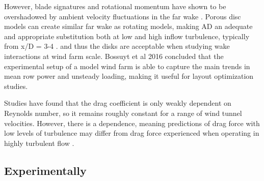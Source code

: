 However, blade signatures and rotational momentum have shown to be overshadowed by ambient velocity fluctuations in the far wake \cite{Aubrun2013}. Porous disc models can create similar far wake as rotating models, making AD an adequate and appropriate substitution both at low and high inflow turbulence, typically from x/D = 3-4 \cite{Neunaber} \cite{Aubrun2019} \cite{Aubrun2013} \cite{Lignarolo2014} \cite{Thenuissen} \cite{CampCal}. and thus the disks are acceptable when studying wake interactions at wind farm scale. Bossuyt et al 2016 concluded that the experimental setup of a model wind farm is able to capture the main trends in mean row power and unsteady loading, making it useful for layout optimization studies. 

Studies have found that the drag coefficient is only weakly dependent on Reynolds number, so it remains roughly constant for a range of wind tunnel velocities. However, there is a dependence, meaning predictions of drag force with low levels of turbulence may differ from drag force experienced when operating in highly turbulent flow \cite{Blackmore2013}.



 


\subsection{Experimentally}


